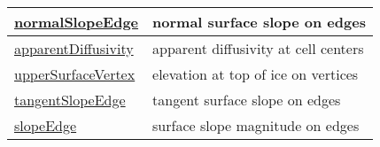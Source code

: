 {\begin{center}
\begin{longtable}{| p{2.0in} | p{4.0in} |}
    \hline
    \hyperref[subsec:var_sec_geometry_normalSlopeEdge]{normalSlopeEdge} & normal surface slope on edges \\
    \hline
    \hyperref[subsec:var_sec_geometry_apparentDiffusivity]{apparentDiffusivity} & apparent diffusivity at cell centers \\
    \hline
    \hyperref[subsec:var_sec_geometry_upperSurfaceVertex]{upperSurfaceVertex} & elevation at top of ice on vertices \\
    \hline
    \hyperref[subsec:var_sec_geometry_tangentSlopeEdge]{tangentSlopeEdge} & tangent surface slope on edges \\
    \hline
    \hyperref[subsec:var_sec_geometry_slopeEdge]{slopeEdge} & surface slope magnitude on edges \\
    \hline
\end{longtable}
\end{center}
}
